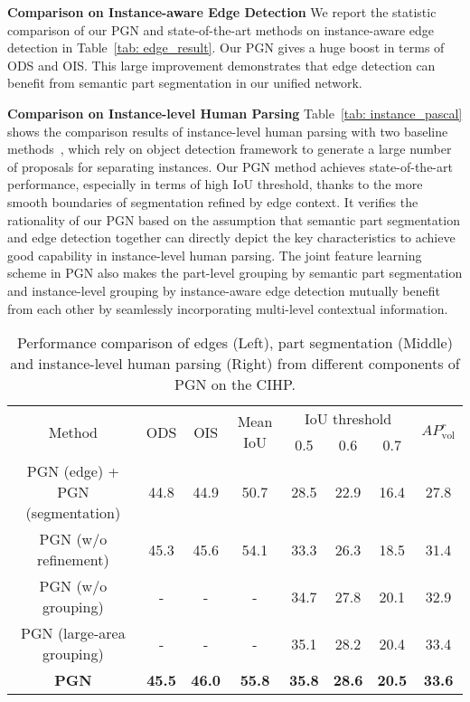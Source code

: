 \documentclass[runningheads]{llncs}
\begin{document}
\textbf{Comparison on Instance-aware Edge Detection}
We report the statistic comparison of our PGN and state-of-the-art methods on instance-aware edge detection in Table~\ref{tab: edge_result}. Our PGN gives a huge boost in terms of ODS and OIS. This large improvement demonstrates that edge detection can benefit from semantic part segmentation in our unified network.

\textbf{Comparison on Instance-level Human Parsing}
Table~\ref{tab: instance_pascal} shows the comparison results of instance-level human parsing with two baseline methods~\cite{Dai_2016_CVPR,li2017holistic}, which rely on object detection framework to generate a large number of proposals for separating instances. Our PGN method achieves state-of-the-art performance, especially in terms of high IoU threshold, thanks to the more smooth boundaries of segmentation refined by edge context. It verifies the rationality of our PGN based on the assumption that semantic part segmentation and edge detection together can directly depict the key characteristics to achieve good capability in instance-level human parsing. The joint feature learning scheme in PGN also makes the part-level grouping by semantic part segmentation and instance-level grouping by instance-aware edge detection mutually benefit from each other by seamlessly incorporating multi-level contextual information.

\begin{table}[t]
\centering
\small
\caption{Performance comparison of edges (Left), part segmentation (Middle) and instance-level human parsing (Right) from different components of PGN on the CIHP.}
\tabcolsep 0.03in
\begin{tabular}{c|cc|c|cccc}
\toprule[0.7pt]
\multirow{2}{*}{Method}        &  \multirow{2}{*}{ODS} & \multirow{2}{*}{OIS} & \multirow{2}{*}{Mean IoU}
                               & \multicolumn{3}{c}{IoU threshold} &  \multirow{2}{*}{$AP^r_\text{vol}$}   \\
                                &   &  &  & 0.5 & 0.6 & 0.7 &   \\ \hline
PGN (edge) + PGN (segmentation) & 44.8       & 44.9      & 50.7   & 28.5  & 22.9  & 16.4  & 27.8  \\
PGN (w/o refinement)            & 45.3       & 45.6      & 54.1   & 33.3  & 26.3  & 18.5  & 31.4  \\
PGN (w/o grouping)              & -          & -         & -      & 34.7  & 27.8  & 20.1  & 32.9  \\
PGN (large-area grouping)       & -          & -         & -      & 35.1  & 28.2  & 20.4  & 33.4  \\     \hline
\textbf{PGN}   & \textbf{45.5} & \textbf{46.0} & \textbf{55.8} & \textbf{35.8} & \textbf{28.6} & \textbf{20.5} & \textbf{33.6} \\
\toprule[0.7pt]
\end{tabular}
\vspace{-8mm}
\label{tab: results_cihp}
\end{table}
\end{document}
